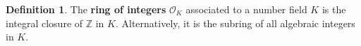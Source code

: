 \documentclass{article}
\theoremstyle{definition}
\theoremstyle{definition}
\newtheorem{definition}{Definition}[theorem]
\theoremstyle{definition}
\theoremstyle{definition}
\theoremstyle{definition}
\theoremstyle{definition}
\theoremstyle{definition}
\begin{document}
\begin{tcolorbox}[colback=purple!5!white,colframe=purple!75!black]
\begin{definition}
The \textbf{ring of integers} $\mathcal{O}_K$ associated to a number field $K$ is the integral closure of $\mathbb{Z}$ in $K$. Alternatively, it is the subring of all algebraic integers in $K$. 
\end{definition}
\end{tcolorbox}
\end{document}
